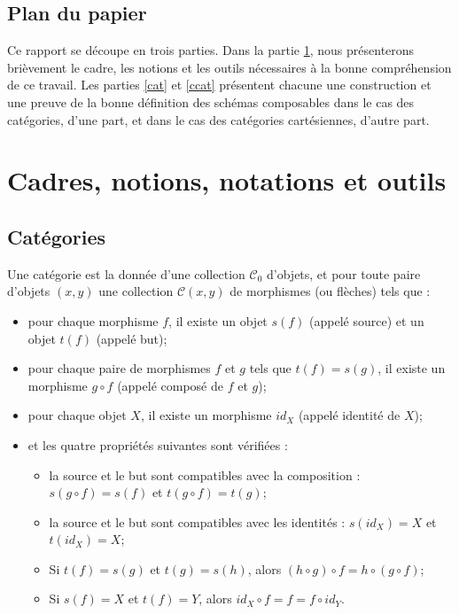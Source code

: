 \documentclass[conference]{IEEEtran}
\begin{document}
	\subsection{Plan du papier} Ce rapport se découpe en trois parties. Dans la partie \ref{cadres}, nous présenterons brièvement le cadre, les notions et les outils nécessaires à la bonne compréhension de ce travail. Les parties \ref{cat} et \ref{ccat} présentent chacune une construction et une preuve de la bonne définition des schémas composables dans le cas des catégories, d'une part, et dans le cas des catégories cartésiennes, d'autre part.
	
	\section{Cadres, notions, notations et outils} \label{cadres}
	
	\subsection{Catégories} Une catégorie est la donnée d'une collection $\mathcal{C}_0$ d'objets, et pour toute paire d'objets $(x, y)$ une collection $\mathcal{C}(x, y)$ de morphismes (ou flèches) tels que : 
	\begin{itemize}
		\item pour chaque morphisme $f$, il existe un objet $s(f)$ (appelé source) et un objet $t(f)$ (appelé but);
		\item pour chaque paire de morphismes $f$ et $g$ tels que $t(f) = s(g)$, il existe un morphisme $g \circ f$ (appelé composé de $f$ et $g$);
		\item pour chaque objet $X$, il existe un morphisme $id_X$ (appelé identité de $X$);
		\item et les quatre propriétés suivantes sont vérifiées :
		\begin{itemize}
			\item la source et le but sont compatibles avec la composition : $s(g \circ f) = s(f)$ et $t(g \circ f) = t(g)$;
			\item la source et le but sont compatibles avec les identités : $s(id_X) = X$ et $t(id_X) = X$;
			\item Si $t(f) = s(g)$ et $t(g) = s(h)$, alors $(h \circ g) \circ f = h \circ (g \circ f)$;
			\item Si $s(f) = X$ et $t(f) = Y$, alors $id_X \circ f = f = f \circ id_Y$.
		\end{itemize}
	\end{itemize}
	
\end{document}
